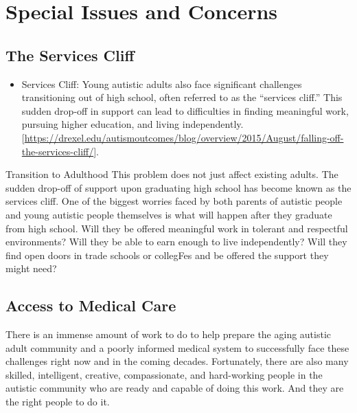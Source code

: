\documentclass[
  letterpaper,
  DIV=11,
  numbers=noendperiod]{scrreprt}
\providecommand{\tightlist}{%
  \setlength{\itemsep}{0pt}\setlength{\parskip}{0pt}}\usepackage{longtable,booktabs,array}
\begin{document}
\appendix
{}

\hypertarget{special-issues-and-concerns}{%
\chapter{Special Issues and
Concerns}\label{special-issues-and-concerns}}

\hypertarget{sec-services_cliff}{%
\section{The Services Cliff}\label{sec-services_cliff}}

\begin{itemize}
\tightlist
\item
  Services Cliff: Young autistic adults also face significant challenges
  transitioning out of high school, often referred to as the ``services
  cliff.'' This sudden drop-off in support can lead to difficulties in
  finding meaningful work, pursuing higher education, and living
  independently.
  {[}\url{https://drexel.edu/autismoutcomes/blog/overview/2015/August/falling-off-the-services-cliff/}{]}.
\end{itemize}

Transition to Adulthood This problem does not just affect existing
adults. The sudden drop-off of support upon graduating high school has
become known as the services cliff. One of the biggest worries faced by
both parents of autistic people and young autistic people themselves is
what will happen after they graduate from high school. Will they be
offered meaningful work in tolerant and respectful environments? Will
they be able to earn enough to live independently? Will they find open
doors in trade schools or collegFes and be offered the support they
might need?

\hypertarget{sec-access_to_care}{%
\section{Access to Medical Care}\label{sec-access_to_care}}

There is an immense amount of work to do to help prepare the aging
autistic adult community and a poorly informed medical system to
successfully face these challenges right now and in the coming decades.
Fortunately, there are also many skilled, intelligent, creative,
compassionate, and hard-working people in the autistic community who are
ready and capable of doing this work. And they are the right people to
do it.
\end{document}
